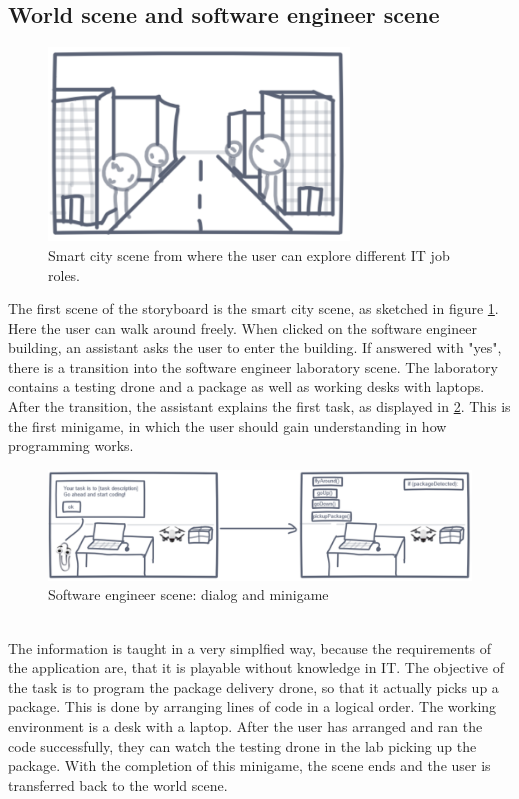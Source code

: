 \subsection{World scene and software engineer scene}
\begin{figure}[h!]
  \includegraphics[width=8cm]{kapitel/storyboard/smart-city.pdf}
  \centering
  \caption{Smart city scene from where the user can explore different IT job roles.}
  \label{fig:smartcity}
\end{figure}
The first scene of the storyboard is the smart city scene, as sketched in figure \ref{fig:smartcity}. Here the user can walk around freely. When clicked on the software engineer building, an assistant asks the user to enter the building. If answered with "yes", there is a transition into the software engineer laboratory scene. The laboratory contains a testing drone and a package as well as working desks with laptops. After the transition, the assistant explains the first task, as displayed in \ref{fig:sescene}. This is the first minigame, in which the user should gain understanding in how programming works.
\begin{figure}[h!]
  \includegraphics[width=16cm]{kapitel/storyboard/se-scene.pdf}
  \centering
  \caption{Software engineer scene: dialog and minigame}
  \label{fig:sescene}
\end{figure}
\\The information is taught in a very simplfied way, because the requirements of the application are, that it is playable without knowledge in IT. The objective of the task is to program the package delivery drone, so that it actually picks up a package. This is done by arranging lines of code in a logical order. The working environment is a desk with a laptop. After the user has arranged and ran the code successfully, they can watch the testing drone in the lab picking up the package. With the completion of this minigame, the scene ends and the user is transferred back to the world scene.
